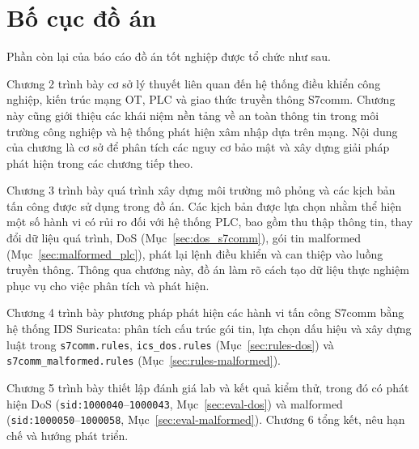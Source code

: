 \documentclass[../main.tex]{subfiles}
\begin{document}
\section{Bố cục đồ án}

Phần còn lại của báo cáo đồ án tốt nghiệp được tổ chức như sau.

Chương 2 trình bày cơ sở lý thuyết liên quan đến hệ thống điều khiển công nghiệp, kiến trúc mạng OT, PLC và giao thức truyền thông S7comm. Chương này cũng giới thiệu các khái niệm nền tảng về an toàn thông tin trong môi trường công nghiệp và hệ thống phát hiện xâm nhập dựa trên mạng. Nội dung của chương là cơ sở để phân tích các nguy cơ bảo mật và xây dựng giải pháp phát hiện trong các chương tiếp theo.

Chương 3 trình bày quá trình xây dựng môi trường mô phỏng và các kịch bản tấn công được sử dụng trong đồ án. Các kịch bản được lựa chọn nhằm thể hiện một số hành vi có rủi ro đối với hệ thống PLC, bao gồm thu thập thông tin, thay đổi dữ liệu quá trình, DoS (Mục~\ref{sec:dos_s7comm}), gói tin malformed (Mục~\ref{sec:malformed_plc}), phát lại lệnh điều khiển và can thiệp vào luồng truyền thông. Thông qua chương này, đồ án làm rõ cách tạo dữ liệu thực nghiệm phục vụ cho việc phân tích và phát hiện.

Chương 4 trình bày phương pháp phát hiện các hành vi tấn công S7comm bằng hệ thống IDS Suricata: phân tích cấu trúc gói tin, lựa chọn dấu hiệu và xây dựng luật trong \texttt{s7comm.rules}, \texttt{ics\_dos.rules} (Mục~\ref{sec:rules-dos}) và \texttt{s7comm\_malformed.rules} (Mục~\ref{sec:rules-malformed}).

Chương 5 trình bày thiết lập đánh giá lab và kết quả kiểm thử, trong đó có phát hiện DoS (\texttt{sid:1000040}--\texttt{1000043}, Mục~\ref{sec:eval-dos}) và malformed (\texttt{sid:1000050}--\texttt{1000058}, Mục~\ref{sec:eval-malformed}). Chương 6 tổng kết, nêu hạn chế và hướng phát triển.
\end{document}
